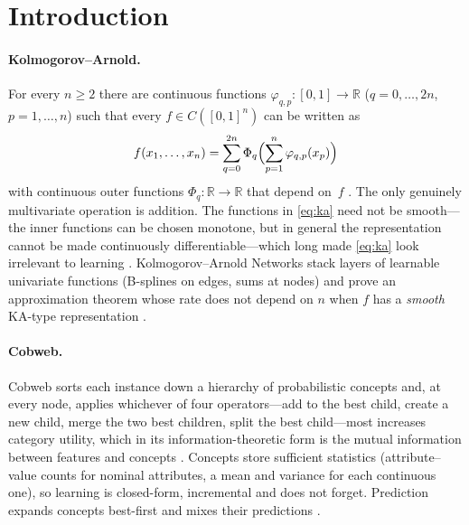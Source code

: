 \documentclass[11pt]{article}
\theoremstyle{definition}
\theoremstyle{remark}
\newcommand{\R}{\mathbb{R}}
\begin{document}
\tableofcontents

\section{Introduction}

\paragraph{Kolmogorov--Arnold.}
For every $n\ge 2$ there are continuous functions $\varphi_{q,p}:[0,1]\to\R$
($q=0,\dots,2n$, $p=1,\dots,n$) such that every $f\in C([0,1]^n)$ can be written as
\begin{equation}\label{eq:ka}
  f(x_1,\dots,x_n)=\sum_{q=0}^{2n}\Phi_q\Bigl(\sum_{p=1}^{n}\varphi_{q,p}(x_p)\Bigr)
\end{equation}
with continuous outer functions $\Phi_q:\R\to\R$ that depend on~$f$
\citep{kolmogorov1957,arnold1957,lorentz1966,sprecher1965}.  The only genuinely
multivariate operation is addition.  The functions in \eqref{eq:ka} need not be
smooth---the inner functions can be chosen monotone, but in general the representation
cannot be made continuously differentiable---which long made \eqref{eq:ka} look
irrelevant to learning \citep{girosi1989}.  Kolmogorov--Arnold Networks \citep{liu2024kan} stack layers of
learnable univariate functions (B-splines on edges, sums at nodes) and prove an
approximation theorem whose rate does not depend on $n$ when $f$ has a \emph{smooth}
KA-type representation \citep[Thm.~2.1]{liu2024kan}.

\paragraph{Cobweb.}
Cobweb \citep{fisher1987} sorts each instance down a hierarchy of probabilistic
concepts and, at every node, applies whichever of four operators---add to the best
child, create a new child, merge the two best children, split the best child---most
increases category utility, which in its information-theoretic form is the mutual
information between features and concepts \citep{corter1992,maclellan2026rational}.
Concepts store sufficient statistics (attribute--value counts for nominal attributes,
a mean and variance for each continuous one), so learning is closed-form, incremental
and does not forget.  Prediction expands concepts best-first and mixes their
predictions \citep{maclellan2026rational}.
\end{document}

